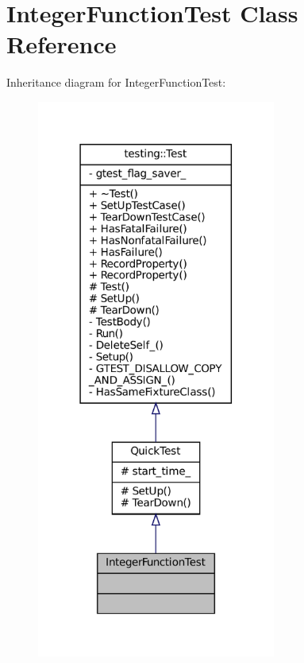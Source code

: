 \hypertarget{classIntegerFunctionTest}{}\section{Integer\+Function\+Test Class Reference}
\label{classIntegerFunctionTest}


Inheritance diagram for Integer\+Function\+Test\+:
\nopagebreak
\begin{figure}[H]
\begin{center}
\leavevmode
\includegraphics[width=223pt]{classIntegerFunctionTest__inherit__graph}
\end{center}
\end{figure}


